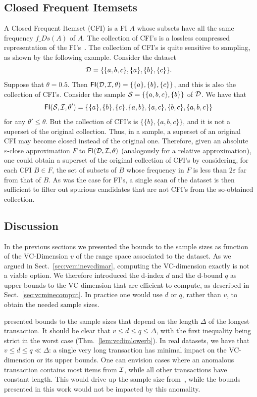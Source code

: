 \subsection{Closed Frequent Itemsets}\label{sec:vcmineclosed}
A Closed Frequent Itemset (CFI) is a FI $A$ whose subsets have all the same frequency
$f\_Ds(A)$ of $A$. The collection of CFI's is a lossless compressed
representation of the FI's~\cite{CaldersRB06}. The collection of CFI's is quite
sensitive to sampling, as shown by the following example. Consider the %
dataset 
\[
  {\cal D}=\{\{a,b,c\}, \{a\}, \{b\}, \{c\}\}
  .
\]
Suppose that $\theta=0.5$. Then $\mathsf{FI}({\cal D},{\cal I},\theta)=\{
\{a\},\{b\},\{c\}\}$, and this is also the collection of CFI's. Consider the sample
${\cal S}=\{\{a,b,c\},\{b\}\}$ of ${\cal D}$. We have that
\[
\mathsf{FI}({\cal S},{\cal I},\theta')=\{\{a\},\{b\},\{c\},\{a,b\},\{a,c\},\{b,c\},\{a,b,c\}\}
\]
for any $\theta'\le\theta$. But the collection of CFI's is
$\{\{b\},\{a,b,c\}\}$, and it is not a superset of the original collection. Thus, in a
sample, a superset of an original CFI may become closed instead of the original one.
Therefore, given an absolute $\varepsilon$-close approximation $F$ to
$\mathsf{FI}({\cal D},{\cal I},\theta)$ (analogously for a relative approximation), one could
obtain a superset of the original collection of CFI's by considering, for each
CFI $B\in F$, the set of subsets of $B$ whose frequency in $F$ is less than
$2\varepsilon$ far from that of $B$. As was the case for FI's, a single scan of
the dataset is then sufficient to filter out spurious candidates that are not
CFI's from the so-obtained collection.

\subsection{Discussion}\label{sec:vcminediscussion}
In the previous sections we presented the bounds to the sample sizes as function
of the VC-Dimension $v$ of the range space associated to the dataset. As we argued
in Sect.~\ref{sec:vcminevcdimar}, computing the VC-dimension exactly is not a viable
option. We therefore introduced the d-index $d$ and the d-bound $q$ as upper
bounds to the VC-dimension that are efficient to compute, as described in
Sect.~\ref{sec:vcminecomput}. In practice one would use $d$ or $q$, rather than $v$,
to obtain the needed sample sizes. 

\citet{ChakaravarthyPS09} presented bounds to the sample sizes that depend on
the length $\Delta$ of the longest transaction. It should be clear that $v\le
d\le q \le \Delta$, with the first inequality being strict in the worst case
(Thm.~\ref{lem:vcdimlowerb}). In real datasets, we have that $v\le d\le q\ll
\Delta$: a single very long transaction has minimal impact on the VC-dimension
or its upper bounds. One can envision cases where an anomalous transaction
contains most items from ${\cal I}$, while all other transactions have constant
length. This would drive up the sample size from~\cite{ChakaravarthyPS09}, while
the bounds presented in this work would not be impacted by this anomality.

